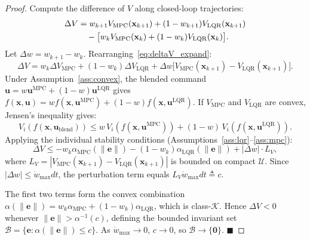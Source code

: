 \documentclass[12pt,a4paper,oneside]{report}
\begin{document}
\begin{proof}
  Compute the difference of \(V\) along closed-loop trajectories:
  \begin{align}
    \Delta V
    &= w_{k+1}V_{\mathrm{MPC}}(\mathbf{x}_{k+1})
     + (1-w_{k+1})V_{\mathrm{LQR}}(\mathbf{x}_{k+1})\notag\\
    &\quad - \bigl[w_k V_{\mathrm{MPC}}(\mathbf{x}_k)
     + (1-w_k)V_{\mathrm{LQR}}(\mathbf{x}_k)\bigr].\label{eq:deltaV_expand}
  \end{align}
  Let \(\Delta w = w_{k+1}-w_k\). Rearranging~\eqref{eq:deltaV_expand}:
  \begin{equation}
    \Delta V =
      w_k\Delta V_{\mathrm{MPC}} + (1-w_k)\Delta V_{\mathrm{LQR}}
      + \Delta w\bigl[V_{\mathrm{MPC}}(\mathbf{x}_{k+1})
                      - V_{\mathrm{LQR}}(\mathbf{x}_{k+1})\bigr].
  \end{equation}
  Under Assumption~\ref{ass:convex}, the blended command
  \(\mathbf{u}=w\mathbf{u}^{\mathrm{MPC}}+(1-w)\mathbf{u}^{\mathrm{LQR}}\)
  gives \(f(\mathbf{x},\mathbf{u}) = wf(\mathbf{x},\mathbf{u}^{\mathrm{MPC}})
  +(1-w)f(\mathbf{x},\mathbf{u}^{\mathrm{LQR}})\). If \(V_{\mathrm{MPC}}\)
  and \(V_{\mathrm{LQR}}\) are convex, Jensen's inequality gives:
  \begin{equation}
    V_i(f(\mathbf{x},\mathbf{u}_{\mathrm{blend}})) \leq
      w\,V_i(f(\mathbf{x},\mathbf{u}^{\mathrm{MPC}})) +
      (1-w)\,V_i(f(\mathbf{x},\mathbf{u}^{\mathrm{LQR}})).
  \end{equation}
  Applying the individual stability conditions
  (Assumptions~\ref{ass:lqr}--\ref{ass:mpc}):
  \begin{equation}
    \Delta V \leq
      -w_k\alpha_{\mathrm{MPC}}(\|\mathbf{e}\|)
      -(1-w_k)\alpha_{\mathrm{LQR}}(\|\mathbf{e}\|)
      +|\Delta w|\cdot L_V,
  \end{equation}
  where \(L_V = |V_{\mathrm{MPC}}(\mathbf{x}_{k+1})-V_{\mathrm{LQR}}(\mathbf{x}_{k+1})|\)
  is bounded on compact \(\mathcal{U}\). Since
  \(|\Delta w|\leq\dot{w}_{\max}dt\), the perturbation term equals
  \(L_V\dot{w}_{\max}dt \triangleq c\).

  The first two terms form the convex combination
  \(\alpha(\|\mathbf{e}\|) = w_k\alpha_{\mathrm{MPC}} + (1-w_k)\alpha_{\mathrm{LQR}}\),
  which is class-\(\mathcal{K}\). Hence \(\Delta V < 0\) whenever
  \(\|\mathbf{e}\| > \alpha^{-1}(c)\), defining the bounded invariant
  set \(\mathcal{B} = \{\mathbf{e}: \alpha(\|\mathbf{e}\|)\leq c\}\).
  As \(\dot{w}_{\max}\to 0\), \(c\to 0\), so
  \(\mathcal{B}\to\{\mathbf{0}\}\). \hfill\(\blacksquare\)
\end{proof}
\end{document}
